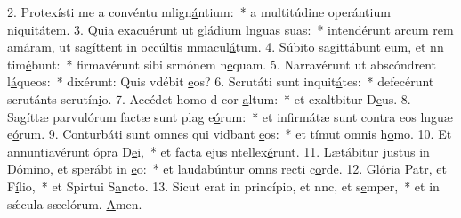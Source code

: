 2. Protexísti me a convéntu mlign\uline{á}ntium:~* a multitúdine operántium niquit\uline{á}tem.
3. Quia exacuérunt ut gládium lnguas s\uline{u}as:~* intendérunt arcum rem amáram, ut sagíttent in occúltis mmacul\uline{á}tum.
4. Súbito sagittábunt eum, et nn tim\uline{é}bunt:~* firmavérunt sibi srmónem n\uline{e}quam.
5. Narravérunt ut abscóndrent l\uline{á}queos:~* dixérunt: Quis vdébit \uline{e}os?
6. Scrutáti sunt inquit\uline{á}tes:~* defecérunt scrutánts scrutín\uline{i}o.
7. Accédet homo d cor \uline{a}ltum:~* et exaltbitur D\uline{e}us.
8. Sagíttæ parvulórum factæ sunt plag e\uline{ó}rum:~* et infirmátæ sunt contra eos lnguæ e\uline{ó}rum.
9. Conturbáti sunt omnes qui vidbant \uline{e}os:~* et tímut omnis h\uline{o}mo.
10. Et annuntiavérunt ópra D\uline{e}i,~* et facta ejus ntellex\uline{é}runt.
11. Lætábitur justus in Dómino, et sperábt in \uline{e}o:~* et laudabúntur omns recti c\uline{o}rde.
12. Glória Patr, et F\uline{í}lio,~* et Spirtui S\uline{a}ncto.
13. Sicut erat in princípio, et nnc, et s\uline{e}mper,~* et in sǽcula sæclórum. \uline{A}men.
